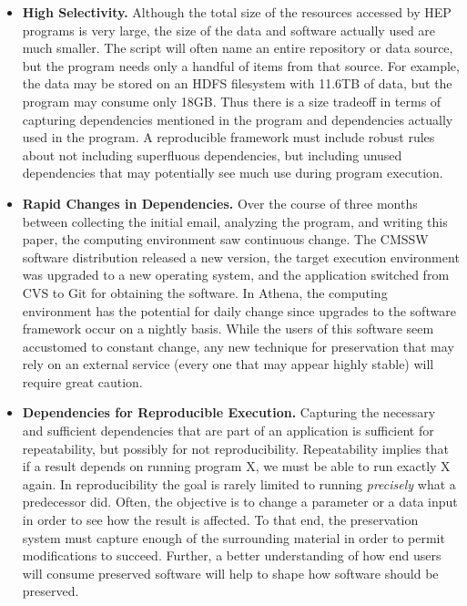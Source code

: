 \begin{itemize}
\item {\bf High Selectivity.}  
Although the total size of the resources accessed by HEP programs is very large, the size of the data and software actually used are much smaller. The script will often name an entire repository or data source, but the program needs only a handful of items from that source. For example, the data may be stored on an HDFS filesystem with 11.6TB of data, but the program may consume only 18GB. Thus there is a size tradeoff in terms of capturing dependencies mentioned in the program and dependencies actually used in the program. A reproducible framework must include robust rules about not including superfluous dependencies, but including unused dependencies that may potentially see much use during program execution.

\item {\bf Rapid Changes in Dependencies.}  
Over the course of three months between collecting the initial email, analyzing the program, and writing this paper, the computing environment saw continuous change. The CMSSW software distribution released a new version, the target execution environment was upgraded to a new operating system, and the application switched from CVS to Git for obtaining the software. In Athena, the computing environment has the potential for daily change since upgrades to the software framework occur on a nightly basis. While the users of this software seem accustomed to constant change, any new technique for preservation that may rely on an external service (every one that may appear highly stable) will require great caution.

\item {\bf Dependencies for Reproducible Execution.} Capturing the necessary and sufficient dependencies that are part of an application is sufficient for repeatability, but possibly for not reproducibility.
Repeatability implies that if a result depends on running program X, we must be able to run exactly X again. In reproducibility the goal is rarely limited to running
\emph{precisely} what a predecessor did. Often, the objective is to
change a parameter or a data input in order to see how the result is affected. To that end, the preservation system must capture enough of the surrounding
material in order to permit modifications to succeed. 
Further, a better understanding of how end users will consume preserved software will help to shape how
software should be preserved.
\end{itemize}

